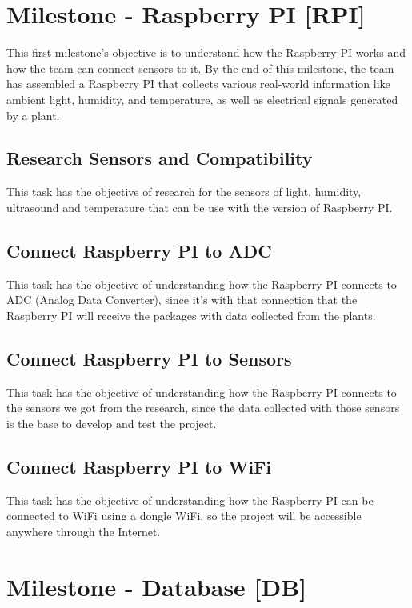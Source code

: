 \documentclass[a4paper, 11pt]{report}
\begin{document}
\section{Milestone - Raspberry PI [RPI] }

This first milestone's objective is to understand how the Raspberry PI works and how the team can connect sensors to it. By the end of this milestone, the team has assembled a Raspberry PI that collects various real-world information like ambient light, humidity, and temperature, as well as electrical signals generated by a plant.


\subsection{Research Sensors and Compatibility}

This task has the objective of research for the sensors of light, humidity, ultrasound and temperature that can be use with the version of Raspberry PI.

\subsection{Connect Raspberry PI to ADC}

This task has the objective of understanding how the Raspberry PI connects to ADC (Analog Data Converter), since it's with that connection that the Raspberry PI will receive the packages with data collected from the plants.

\subsection{Connect Raspberry PI to Sensors}

This task has the objective of understanding how the Raspberry PI connects to the sensors we got from the research, since the data collected with those sensors is the base to develop and test the project.

\subsection{Connect Raspberry PI to WiFi}

This task has the objective of understanding how the Raspberry PI can be connected to WiFi using a dongle WiFi, so the project will be accessible anywhere through the Internet.

\section{Milestone - Database [DB] }
\end{document}

